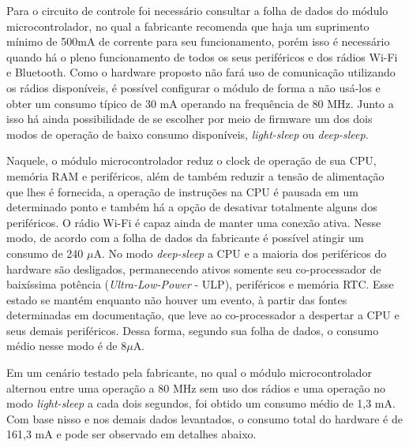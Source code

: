 Para o circuito de controle foi necessário consultar a folha de dados do módulo microcontrolador, no qual a fabricante recomenda que haja um suprimento mínimo de 500mA de corrente para seu funcionamento, porém isso é necessário quando há o pleno funcionamento de todos os seus periféricos e dos rádios Wi-Fi e Bluetooth. Como o hardware proposto não fará uso de comunicação utilizando os rádios disponíveis, é possível configurar o módulo de forma a não usá-los e obter um consumo típico de 30 mA operando na frequência de 80 MHz. Junto a isso há ainda possibilidade de se escolher por meio de firmware um dos dois modos de operação de baixo consumo disponíveis, \textit{light-sleep} ou \textit{deep-sleep}. 

Naquele, o módulo microcontrolador reduz o clock de operação de sua CPU, memória RAM e periféricos, além de também reduzir a tensão de alimentação que lhes é fornecida, a operação de instruções na CPU é pausada em um determinado ponto e também há a opção de desativar totalmente alguns dos periféricos. O rádio Wi-Fi é capaz ainda de manter uma conexão ativa. Nesse modo, de acordo com a folha de dados da fabricante é possível atingir um consumo de 240 $\mu$A.
No modo \textit{deep-sleep} a CPU e a maioria dos periféricos do hardware são desligados, permanecendo ativos somente seu co-processador de baixíssima potência (\textit{Ultra-Low-Power} - ULP), periféricos e memória RTC. Esse estado se mantém enquanto não houver um evento, à partir das fontes determinadas em documentação, que leve ao co-processador a despertar a CPU e seus demais periféricos. Dessa forma, segundo sua folha de dados, o consumo médio nesse modo é de 8$\mu$A.

Em um cenário testado pela fabricante, no qual o módulo microcontrolador alternou entre uma operação a 80 MHz sem uso dos rádios e uma operação no modo \textit{light-sleep} a cada dois segundos, foi obtido um consumo médio de 1,3 mA. Com base nisso e nos demais dados levantados, o consumo total do hardware é de 161,3 mA e pode ser observado em detalhes abaixo.

